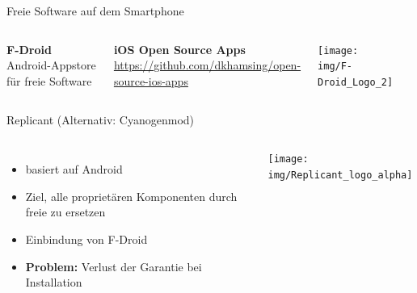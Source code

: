 \documentclass[12pt, xcolor={svgnames,table}]{beamer}
\begin{document}
\begin{frame}{Freie Software auf dem Smartphone}
  \begin{columns}
    \column{6.5cm}

    \textbf{F-Droid}\\
    Android-Appstore für freie Software

    \vspace{0.5cm}

    \textbf{iOS Open Source Apps}\\
    \url{https://github.com/dkhamsing/open-source-ios-apps}

    \column{5cm}

    \begin{center}
      \texttt{[image: img/F-Droid\_Logo\_2]}
    \par\end{center}
    \begin{center}
    \par\end{center}
  \end{columns}
\end{frame}

\begin{frame}{Replicant (Alternativ: Cyanogenmod)}
  \begin{columns}
    \column{6cm}
    \begin{itemize}
      \item basiert auf Android
      \item Ziel, alle proprietären Komponenten durch freie zu ersetzen
      \item Einbindung von F-Droid
      \item \textbf{Problem:} Verlust der Garantie bei Installation
    \end{itemize}
    \column{5cm}
    \begin{center}
      \texttt{[image: img/Replicant\_logo\_alpha]}
    \par\end{center}
  \end{columns}
\end{frame}
\end{document}

